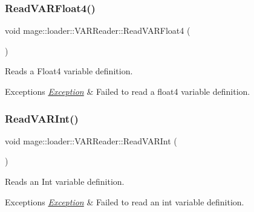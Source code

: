 \subsubsection{\texorpdfstring{Read\+V\+A\+R\+Float4()}{ReadVARFloat4()}}
{\footnotesize\ttfamily void mage\+::loader\+::\+V\+A\+R\+Reader\+::\+Read\+V\+A\+R\+Float4 (\begin{DoxyParamCaption}{ }\end{DoxyParamCaption})\hspace{0.3cm}{\ttfamily [private]}}

Reads a Float4 variable definition.


\begin{DoxyExceptions}{Exceptions}
{\em \mbox{\hyperlink{classmage_1_1_exception}{Exception}}} & Failed to read a float4 variable definition. \\
\hline
\end{DoxyExceptions}
\mbox{\label{classmage_1_1loader_1_1_v_a_r_reader_a88a819066140cacd8ce494fca125e1e2}} 
\subsubsection{\texorpdfstring{Read\+V\+A\+R\+Int()}{ReadVARInt()}}
{\footnotesize\ttfamily void mage\+::loader\+::\+V\+A\+R\+Reader\+::\+Read\+V\+A\+R\+Int (\begin{DoxyParamCaption}{ }\end{DoxyParamCaption})\hspace{0.3cm}{\ttfamily [private]}}

Reads an Int variable definition.


\begin{DoxyExceptions}{Exceptions}
{\em \mbox{\hyperlink{classmage_1_1_exception}{Exception}}} & Failed to read an int variable definition. \\
\hline
\end{DoxyExceptions}
\mbox{\label{classmage_1_1loader_1_1_v_a_r_reader_a4e84ca5a6fabcf2ea29fbf32a5bdf1c4}} 
